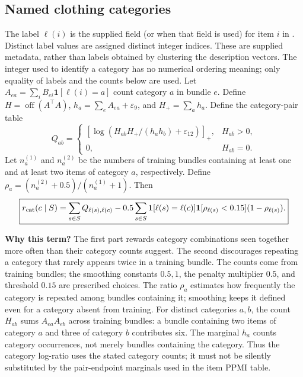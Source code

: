 \documentclass[11pt,a4paper]{article}
\newcommand{\off}{\operatorname{off}}\newcommand{\diag}{\operatorname{diag}}
\newcommand{\why}{\par\textbf{Why this term?} }
\numberwithin{equation}{section}
\begin{document}
\subsection{Named clothing categories}
The label $\ell(i)$ is the supplied  field (or 
when that field is used) for item $i$ in . Distinct label
values are assigned distinct integer indices. These are supplied metadata,
rather than labels obtained by clustering the description vectors. The integer used to identify a category has no numerical
ordering meaning; only equality of labels and the counts below are used.
Let $A_{ea}=\sum_i B_{ei}\mathbf1[\ell(i)=a]$ count category $a$ in bundle $e$.
Define $H=\off(A^\top A)$, $h_a=\sum_e A_{ea}+\varepsilon_9$, and $H_+=\sum_a h_a$.
Define the category-pair table
\begin{equation}
 Q_{ab}=\begin{cases}[\log(H_{ab}H_+/(h_a h_b)+\varepsilon_{12})]_+,&H_{ab}>0,\\0,&H_{ab}=0.\end{cases}
\end{equation}
Let $n_a^{(1)}$ and $n_a^{(2)}$ be the numbers of training bundles containing at least
one and at least two items of category $a$, respectively. Define
$\rho_a=(n_a^{(2)}+0.5)/(n_a^{(1)}+1)$. Then
\begin{equation}
 \boxed{r_{\rm cat}(c\mid S)=\sum_{s\in S}Q_{\ell(s),\ell(c)}
 -0.5\sum_{s\in S}\mathbf1[\ell(s)=\ell(c)]\mathbf1[\rho_{\ell(s)}<0.15](1-\rho_{\ell(s)}).}
\end{equation}
\why The first part rewards category combinations seen together more often than their
category counts suggest. The second discourages repeating a category that rarely appears
twice in a training bundle. The counts come from training bundles; the smoothing constants $0.5,1$, the penalty multiplier $0.5$, and threshold $0.15$ are prescribed choices. The ratio $\rho_a$ estimates how frequently the category is repeated among bundles containing it; smoothing keeps it defined even for a category absent from training.
For distinct categories $a,b$, the count $H_{ab}$ sums $A_{ea}A_{eb}$ across
training bundles: a bundle containing two items of category $a$ and three of
category $b$ contributes six. The marginal $h_a$ counts category occurrences,
not merely bundles containing the category. Thus the category log-ratio uses
the stated category counts; it must not be silently substituted by the
pair-endpoint marginals used in the item PPMI table.
\end{document}

